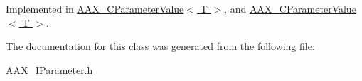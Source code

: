 Implemented in \hyperlink{a00035_a96661507efdc490252bbfebe5d716c65}{A\+A\+X\+\_\+\+C\+Parameter\+Value$<$ T $>$}, and \hyperlink{a00035_a35153159e40183807eae373c21b38bcc}{A\+A\+X\+\_\+\+C\+Parameter\+Value$<$ T $>$}.



The documentation for this class was generated from the following file\+:\begin{DoxyCompactItemize}
\item 
\hyperlink{a00257}{A\+A\+X\+\_\+\+I\+Parameter.\+h}\end{DoxyCompactItemize}
